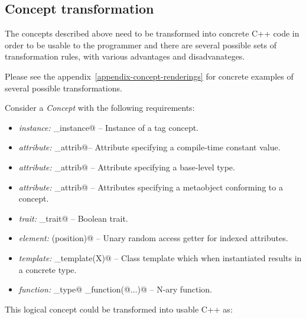 \subsection{Concept transformation}
\label{section-concept-rendering}

The concepts described above need to be transformed into concrete
C++ code in order to be usable to the programmer and there are several
possible sets of transformation rules, with various advantages and
disadvanateges.

Please see the appendix~\ref{appendix-concept-renderings} for concrete
examples of several possible transformations.

Consider a \emph{Concept} with the following requirements:

\begin{itemize}

\item {\em instance:}  \verb@some_instance@ -- Instance of a tag concept.

\item {\em attribute:}  \verb@Constant@ \verb@constant_attrib@-- Attribute specifying a compile-time constant value.

\item {\em attribute:}  \verb@Type@ \verb@type_attrib@ -- Attribute specifying a base-level type.

\item {\em attribute:}  \verb@Concept@ \verb@concept_attrib@ -- Attributes specifying a metaobject conforming to a concept.

\item {\em trait:}  \verb@bool@ \verb@some_trait@ -- Boolean trait.

\item {\em element:}  \verb@Element@ \verb@element(position)@ -- Unary random access getter for indexed attributes.

\item {\em template:}  \verb@some_template(X)@ -- Class template which when instantiated results in a concrete type.

\item {\em function:}  \verb@result_type@ \verb@some_function(@$\dots$\verb@)@ -- N-ary function.

\end{itemize}

This logical concept could be transformed into usable C++ as:

